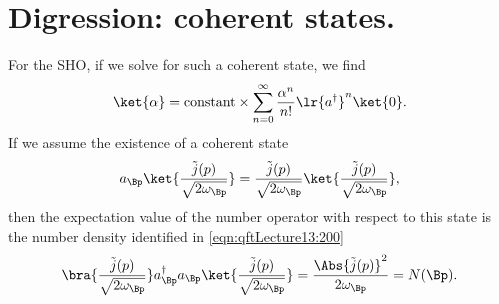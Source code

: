 %
%
\section{Digression: coherent states.}
For the SHO, if we solve for such a coherent state, we find
\begin{equation}\label{eqn:qftLecture13:240}
\ket{\alpha} = \text{constant} \times \sum_{n = 0}^\infty \frac{\alpha^n}{n!} \lr{ a^\dagger }^n \ket{0}.
\end{equation}
If we assume the existence of a coherent state
\begin{equation}\label{eqn:qftLecture13:260}
a_\Bp \ket{
\frac{\tilde{j}(p)}{\sqrt{2 \omega_\Bp}}
}
=
\frac{\tilde{j}(p)}{\sqrt{2 \omega_\Bp}}
\ket{
\frac{\tilde{j}(p)}{\sqrt{2 \omega_\Bp}}
},
\end{equation}
then the expectation value of the number operator with respect to this state is the number density identified in \cref{eqn:qftLecture13:200}
\begin{equation}\label{eqn:qftLecture13:1200}
\bra{
\frac{\tilde{j}(p)}{\sqrt{2 \omega_\Bp}}
}
a_\Bp^\dagger a_\Bp
\ket{
\frac{\tilde{j}(p)}{\sqrt{2 \omega_\Bp}}
} = \frac{\Abs{\tilde{j}(p)}^2}{2 \omega_\Bp} = N(\Bp).
\end{equation}
